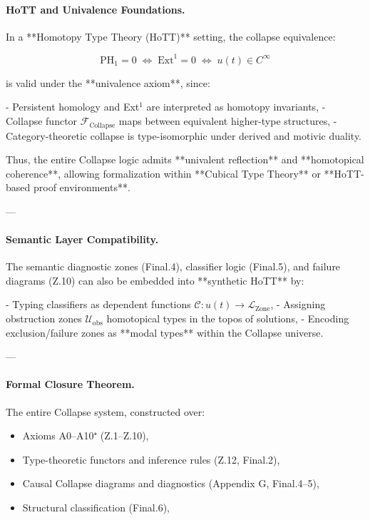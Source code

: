 \documentclass[11pt]{article}
\begin{document}
\begin{axiom}
\begin{axiom}
{{\paragraph{HoTT and Univalence Foundations.}  
In a **Homotopy Type Theory (HoTT)** setting, the collapse equivalence:

\[
\mathrm{PH}_1 = 0 \;\Leftrightarrow\; \mathrm{Ext}^1 = 0 \;\Leftrightarrow\; u(t) \in C^\infty
\]

is valid under the **univalence axiom**, since:

- Persistent homology and Ext$^1$ are interpreted as homotopy invariants,
- Collapse functor \(\mathcal{F}_{\text{Collapse}}\) maps between equivalent higher-type structures,
- Category-theoretic collapse is type-isomorphic under derived and motivic duality.

Thus, the entire Collapse logic admits **univalent reflection** and **homotopical coherence**,  
allowing formalization within **Cubical Type Theory** or **HoTT-based proof environments**.

---

\paragraph{Semantic Layer Compatibility.}  
The semantic diagnostic zones (Final.4), classifier logic (Final.5), and failure diagrams (Z.10)  
can also be embedded into **synthetic HoTT** by:

- Typing classifiers as dependent functions \( \mathcal{C} : u(t) \to \mathcal{L}_{\text{Zone}} \),
- Assigning obstruction zones \( \mathcal{U}_{\mathrm{obs}} \) homotopical types in the topos of solutions,
- Encoding exclusion/failure zones as **modal types** within the Collapse universe.

---

\paragraph{Formal Closure Theorem.}  
The entire Collapse system, constructed over:

\begin{itemize}
  \item Axioms A0–A10⁺ (Z.1–Z.10),
  \item Type-theoretic functors and inference rules (Z.12, Final.2),
  \item Causal Collapse diagrams and diagnostics (Appendix G, Final.4–5),
  \item Structural classification (Final.6),
\end{itemize}

}}
\end{axiom}
\end{axiom}
\end{document}
